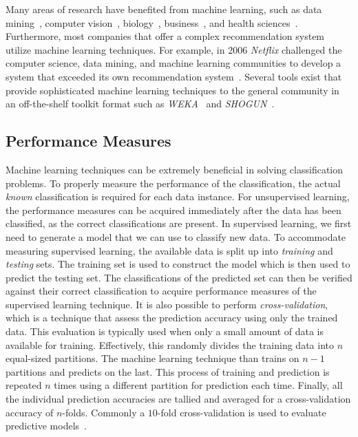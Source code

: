 Many areas of research have benefited from machine learning, such as data mining~\cite{WFH11}, computer vision~\cite{Her03}, biology~\cite{OLP08}, business~\cite{Her00}, and health sciences~\cite{Kon01}. Furthermore, most companies that offer a complex recommendation system utilize machine learning techniques. For example, in 2006 \emph{Netflix} challenged the computer science, data mining, and machine learning communities to develop a system that exceeded its own recommendation system~\cite{BL07}. Several tools exist that provide sophisticated machine learning techniques to the general community in an off-the-shelf toolkit format such as \emph{WEKA}~\cite{HFH+09} and \emph{SHOGUN}~\cite{SRH+10}.


\subsection{Performance Measures}
\label{subsec:background_performance_measures}
Machine learning techniques can be extremely beneficial in solving classification problems. To properly measure the performance of the classification, the actual \emph{known} classification is required for each data instance. For unsupervised learning, the performance measures can be acquired immediately after the data has been classified, as the correct classifications are present. In supervised learning, we first need to generate a model that we can use to classify new data. To accommodate measuring supervised learning, the available data is split up into \emph{training} and \emph{testing} sets. The training set is used to construct the model which is then used to predict the testing set. The classifications of the predicted set can then be verified against their correct classification to acquire performance measures of the supervised learning technique. It is also possible to perform \emph{cross-validation}, which is a technique that assess the prediction accuracy using only the trained data. This evaluation is typically used when only a small amount of data is available for training. Effectively, this randomly divides the training data into $n$ equal-sized partitions. The machine learning technique than trains on $n-1$ partitions and predicts on the last. This process of training and prediction is repeated $n$ times using a different partition for prediction each time. Finally, all the individual prediction accuracies are tallied and averaged for a cross-validation accuracy of $n$-folds. Commonly a $10$-fold cross-validation is used to evaluate predictive models~\cite{Koh95}.


